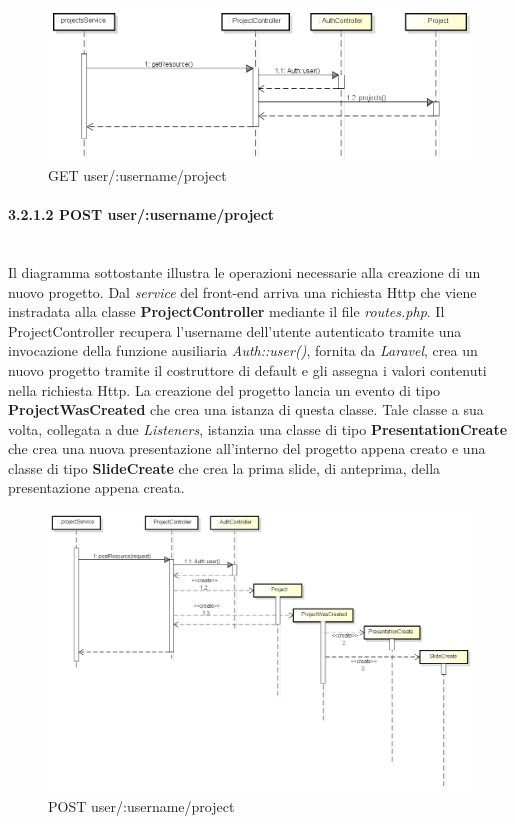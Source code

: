 	\begin{figure}[h]
		\centering
		\includegraphics[width=0.7\linewidth]{img/GET_projects}
		\caption[GET user/:username/project]{GET user/:username/project}
		\label{fig:GET user/:username/project}
	\end{figure}

\newpage
\paragraph{3.2.1.2 POST user/:username/project}\mbox{}\\
Il diagramma sottostante illustra le operazioni necessarie alla creazione di un nuovo progetto. Dal \textit{service} del front-end arriva una richiesta Http che viene instradata alla classe \textbf{ProjectController} mediante il file \textit{routes.php}. Il ProjectController recupera l'username dell'utente autenticato tramite una invocazione della funzione ausiliaria \textit{Auth::user()}, fornita da \textit{Laravel}, crea un nuovo progetto tramite il costruttore di default e gli assegna i valori contenuti nella richiesta Http. La creazione del progetto lancia un evento di tipo \textbf{ProjectWasCreated} che crea una istanza di questa classe. Tale classe a sua volta, collegata a due \textit{Listeners}, istanzia una classe di tipo \textbf{PresentationCreate} che crea una nuova presentazione all'interno del progetto appena creato e una classe di tipo \textbf{SlideCreate} che crea la prima \gls{slide}, di anteprima, della presentazione appena creata.

	\begin{figure}[h]
		\centering
		\includegraphics[width=0.6\linewidth]{img/POST_project}
		\caption[POST user/:username/project]{POST user/:username/project}
		\label{fig:POST user/:username/project}
	\end{figure}

